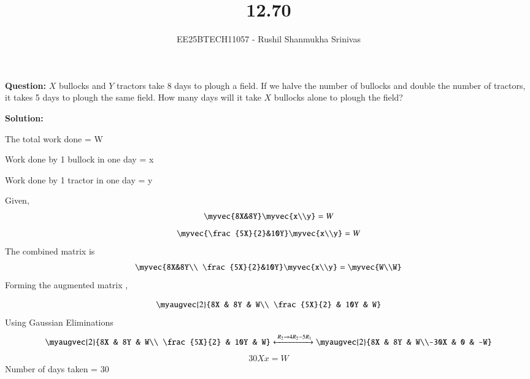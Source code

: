 \documentclass[journal]{IEEEtran}
\begin{document}




\title{12.70}
\author{EE25BTECH11057 - Rushil Shanmukha Srinivas
}
{\let\newpage\relax\maketitle}

\renewcommand{\thefigure}{\theenumi}
\renewcommand{\thetable}{\theenumi}
\setlength{\intextsep}{10pt} %

\renewcommand{\thetable}{\theenumi}
\textbf{Question: }$X$ bullocks and $Y$ tractors take 8 days to plough a field. If we halve the number of bullocks and double the number of tractors, it takes 5 days to plough the same field.
How many days will it take $X$ bullocks alone to plough the field?

\textbf{Solution: }

The total work done = W

Work done by 1 bullock in one day = x

Work done by 1 tractor in one day = y

Given,
\begin{align}
\myvec{8X&8Y}\myvec{x\\y} = W
\end{align}
\begin{align}
\myvec{\frac{5X}{2}&10Y}\myvec{x\\y} = W
\end{align}
The combined matrix is
\begin{align}
\myvec{8X&8Y\\
        \frac{5X}{2}&10Y}\myvec{x\\y} = \myvec{W\\W}
\end{align}
Forming the augmented matrix ,

\begin{align}
  \myaugvec{2}{8X & 8Y & W\\ \frac{5X}{2} & 10Y & W}
\end{align}
Using Gaussian Eliminations
\begin{align}
\myaugvec{2}{8X & 8Y & W\\ \frac{5X}{2} & 10Y & W} 
\xleftrightarrow{\;R_2 \to 4R_2 -5R_1}
 \myaugvec{2}{8X & 8Y & W\\-30X & 0 & -W} 
\end{align}
\begin{align}
30Xx = W
\end{align}
Number of days taken = 30
\end{document}
